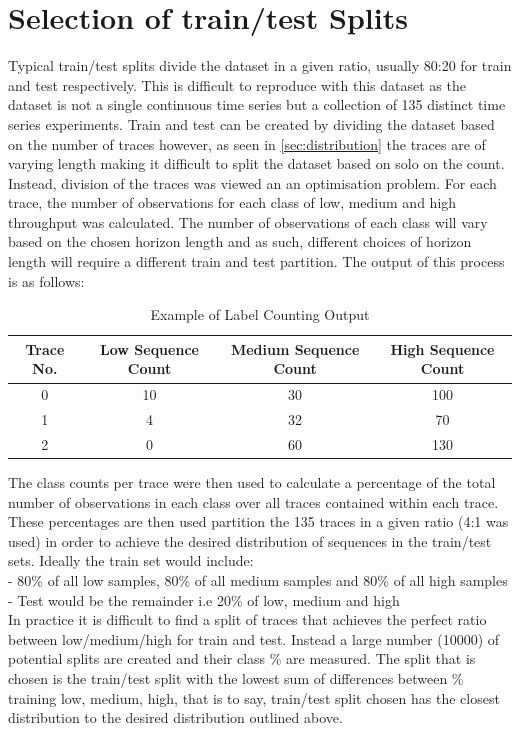 \section{Selection of train/test Splits}
Typical train/test splits divide the dataset in a given ratio, usually 80:20 for train and test respectively. This is difficult to reproduce with this dataset as the dataset is not a single continuous time series but a collection of 135 distinct time series experiments. Train and test can be created by dividing the dataset based on the number of traces however, as seen in \ref{sec:distribution} the traces are of varying length making it difficult to split the dataset based on solo on the count. Instead, division of the traces was viewed an an optimisation problem. For each trace, the number of observations for each class of low, medium and high throughput was calculated. The number of observations of each class will vary based on the chosen horizon length and as such, different choices of horizon length will require a different train and test partition. The output of this process is as follows:
\begin{table}[!htb]
  \centering
  \caption{Example of Label Counting Output}
  \begin{tabular}{|c|c|c|c|}
    \hline
    Trace No. & Low Sequence Count & Medium Sequence Count & High Sequence Count \\
    \hline
    0 & 10 & 30 & 100 \\
    1 & 4 & 32 & 70\\
    2  & 0 & 60 & 130\\
    \hline
  \end{tabular}
\end{table}
The class counts per trace were then used to calculate a percentage of the total number of observations in each class over all traces contained within each trace. These percentages are then used partition the 135 traces in a given ratio (4:1 was used) in order to achieve the desired distribution of sequences in the train/test sets. Ideally the train set would include: \\
- 80\% of all low samples, 80\% of all medium samples and 80\% of all high samples \\
- Test would be the remainder i.e 20\% of low, medium and high \\

In practice it is difficult to find a split of traces that achieves the perfect ratio between low/medium/high for train and test. Instead a large number (10000) of potential splits are created and their class \% are measured. The split that is chosen is the train/test split with the lowest sum of differences between \% training low, medium, high, that is to say, train/test split chosen has the closest distribution to the desired distribution outlined above.

